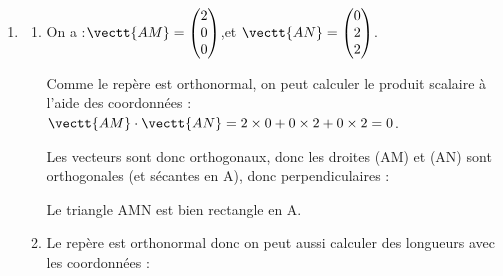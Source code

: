 \begin{enumerate}
\begin{enumerate}
			$S : \left\{\begin{array}{l}1 + t = 0\\1 - t = k\\1 - t = k\end{array}\right.$
			\qquad on a :\quad
			$S \iff \left\{\begin{array}{l}t = -1 \\k = 1 - (-1)\\k = 1 - (-1)\end{array}\right.$
			\qquad
			Soit \quad$S \iff \left\{\begin{array}{l}t = -1 \\k = 2\\k = 2\end{array}\right.$

			On en déduit que seul un point est commun aux deux droites, c'est le point de paramètre $t = -1$ sur (GM), qui est aussi le point de paramètre $k = 2$ sur (AH).

			Qu'on utilise une représentation paramétrique ou l'autre pour trouver les coordonnées de N, on a bien :\quad N$\big(1 + (- 1) ~;~ 1 -(- 1) ~;~ 1 -(- 1)\big)$ \quad c'est-à-dire \quad N$(0 ~;~ 2 ~;~ 2)$.
		\end{enumerate}

		\item
		\begin{enumerate}
			\item On a :\quad $\vectt{AM} = \begin{pmatrix}2\\0\\0\end{pmatrix}$,\quad et \quad $\vectt{AN} = \begin{pmatrix}0\\2\\2\end{pmatrix}$.

			Comme le repère est orthonormal, on peut calculer le produit scalaire à l'aide des coordonnées :
			\quad $\vectt{AM} \cdot \vectt{AN} = 2 \times 0 + 0 \times 2 + 0 \times 2 = 0$.

			Les vecteurs sont donc orthogonaux, donc les droites (AM) et (AN) sont orthogonales (et sécantes en A), donc perpendiculaires :

			Le triangle AMN est bien rectangle en A.

			\item Le repère est orthonormal donc on peut aussi calculer des longueurs avec les coordonnées :


\end{enumerate}
\end{enumerate}
